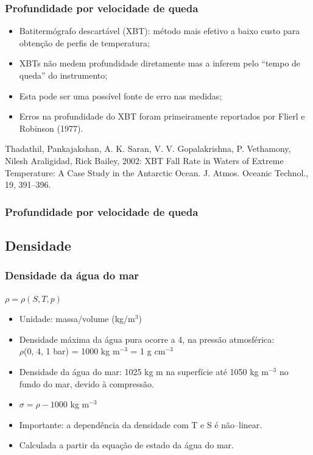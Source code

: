 \begin{frame}
\frametitle{Profundidade por velocidade de queda}
        \small{
        \begin{itemize}[<+-| alert@+>]
            \item Batitermógrafo descartável (XBT): método mais efetivo a baixo
                  custo para obtenção de perfis de temperatura;
            \item XBTs não medem profundidade diretamente mas a inferem pelo
                  ``tempo de queda'' do instrumento;
            \item Esta pode ser uma possível fonte de erro nas medidas;
            \item Erros na profundidade do XBT foram primeiramente reportados
                  por Flierl e Robinson (1977).
        \end{itemize}
        }
    \pause
    \begin{block}{}
    Thadathil, Pankajakshan, A. K. Saran, V. V. Gopalakrishna, P. Vethamony, Nilesh Araligidad, Rick Bailey, 2002: XBT Fall Rate in Waters of Extreme Temperature: A Case Study in the Antarctic Ocean. J. Atmos. Oceanic Technol., 19, 391–396.
    \end{block}
\end{frame}


\begin{frame}
\frametitle{Profundidade por velocidade de queda}
    \begin{center}
    \end{center}
\end{frame}


\subsection{Densidade}
\begin{frame}
\frametitle{Densidade da água do mar}
    \begin{block}{}
    \begin{center}
        $\rho = \rho(S, T, p)$
    \end{center}
    \end{block}
    \pause
    \footnotesize{
    \begin{itemize}[<+-| alert@+>]
    \item Unidade: massa/volume (kg/m$^3$)
    \item Densidade máxima da água pura ocorre a 4\textcelsius, na pressão
          atmosférica:\\
             $\rho$(0, 4\textcelsius, 1 bar) = 1000 kg m$^{-3}$ = 1 g cm$^{-3}$
    \item Densidade da água do mar: 1025 kg m na superfície até 1050 kg m$^{-3}$
          no fundo do mar, devido à compressão.
    \item $\sigma = \rho -1000$ kg m$^{-3}$
    \item Importante: a dependência da densidade com T e S é não--linear.
    \item Calculada a partir da equação de estado da água do mar.
    \end{itemize}
    }
\end{frame}


